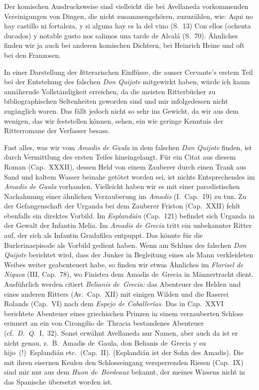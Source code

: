 Der komischen Ausdrucksweise sind vielleicht die bei Avellaneda
vorkommenden Vereinigungen von Dingen, die nicht zusammengehören,
zuzuzählen, wie: {\itquoted\spanish Aqui no hay castillo ni fortaleza, y si
alguna hay es la del vino} (S.~13) {\itquoted\spanish Con ellos
(ochenta ducados) y notable gusto
nos salimos una tarde de Alcalá} (S.~70). Ähnliches finden wir ja auch bei
anderen komischen Dichtern, bei Heinrich Heine und oft bei den Franzosen.

\blankline

In einer Darstellung der {\emph litterarischen Einflüsse,} die ausser
Cervante's erstem Teil bei der Entstehung des falschen {\it Don Quijote}
mitgewirkt haben, würde ich kaum annähernde Vollständigkeit erreichen,
da die meisten Ritterbücher zu bibliographischen Seltenheiten geworden
sind und mir infolgedessen nicht zugänglich waren. Das fällt jedoch
nicht so sehr ins Gewicht, da wir aus dem wenigen, das wir feststellen
können, sehen, ein wie geringe Kenntnis der Ritterromane der Verfasser
besass.

Fast alles, was wir vom {\it Amadis de Gaula} in dem falschen
{\it Don Quijote} finden, ist durch Vermittlung des ersten Teiles hineingelangt.
Für ein Citat aus diesem Roman (Cap.~XXXII), dessen Held von einem
Zauberer durch einen Trank aus Sand und kaltem Wasser beinahe getötet
worden sei, ist nichts Entsprechendes im {\it Amadis de Gaula} vorhanden.
Vielleicht haben wir es mit einer parodistischen Nachahmung
einer ähnlichen Verzauberung im {\it Amadis} (I.~Cap.~19) zu tun. Zu der
Gefangenschaft der Urganda bei dem Zauberer Friston (Cap.~XXII) fehlt
ebenfalls ein direktes Vorbild. Im {\it Esplandián} (Cap.~121) befindet sich
Urganda in der Gewalt der Infantin Melia. Im {\it Amadis de Grecia} tritt
ein unbekannter Ritter auf, der sich als Infantin Gradafilea entpuppt.
Das könnte für die Burlerinaepisode als Vorbild gedient haben. Wenn
am Schluss des falschen {\it Don Quijote} berichtet wird, dass der Junker
in Begleitung eines als Mann verkleideten Weibes weiter geabenteuert
habe, so finden wir etwas Ähnliches im {\it Florisel de Niquea} (III, Cap.~78),
wo Finistea dem Amadis de~Grecia in Männertracht dient. Ausführlich
werden citiert {\it Belianis de~Grecia:} das Abenteuer des Helden und eines
anderen Ritters (Av.\ Cap.~XII) mit einigen Wilden und die Raserei
Rolands (Cap.~VI) nach dem {\it Espejo de Caballerías.} Das in Cap.~XXVI
berichtete Abenteuer eines griechischen Prinzen in einem verzauberten
Schloss erinnert an ein von Cirongilio de~Thracia bestandenes
Abenteuer (cf.~{\it D.~Q.}\ I,~32). Sonst erwähnt Avellaneda nur Namen, aber auch
da ist er nicht genau, z.~B.~{\itquoted Amadis de~Gaula}, {\itquoted don Belianis de~Grecia
y su hijo~(!)\ Esplandián} etc.\ (Cap.~II). (Esplandián ist der Sohn des
Amadis). Die mit ihren eisernen Keulen den Schlosseingang versperrenden
Riesen (Cap.~IX) sind mir nur aus dem {\it Huon de~Bordeaux} bekannt,
der meines Wissens nicht in das Spanische übersetzt worden ist.

